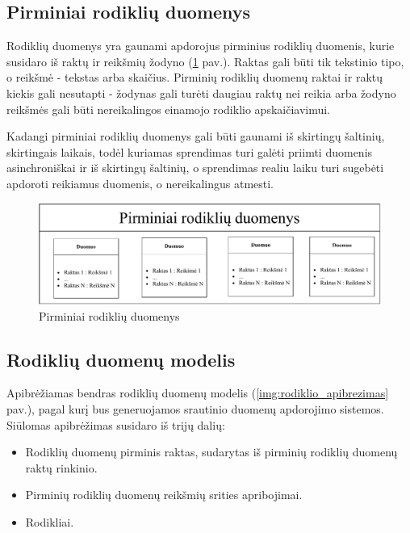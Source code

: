 \documentclass{VUMIFPSbakalaurinis}
\begin{document}
\subsection{Pirminiai rodiklių duomenys}

Rodiklių duomenys yra gaunami apdorojus pirminius rodiklių duomenis, kurie susidaro iš raktų ir reikšmių žodyno (\ref{img:duomenys} pav.). Raktas gali būti tik tekstinio tipo, o reikšmė - tekstas arba skaičius. Pirminių rodiklių duomenų raktai ir raktų kiekis gali nesutapti - žodynas gali turėti daugiau raktų nei reikia arba žodyno reikšmės gali būti nereikalingos einamojo rodiklio apskaičiavimui. \par 
Kadangi pirminiai rodiklių duomenys gali būti gaunami iš skirtingų šaltinių, skirtingais laikais, todėl kuriamas sprendimas turi galėti priimti duomenis asinchroniškai ir iš skirtingų šaltinių, o sprendimas realiu laiku turi sugebėti apdoroti reikiamus duomenis, o nereikalingus atmesti. 

\begin{figure}[H]
    \centering
    \includegraphics[width=1\textwidth]{img/duomenys.pdf}
    \caption{Pirminiai rodiklių duomenys}
    \label{img:duomenys}
\end{figure}

\subsection{Rodiklių duomenų modelis}

Apibrėžiamas bendras rodiklių duomenų modelis (\ref{img:rodiklio_apibrezimas} pav.), pagal kurį bus generuojamos srautinio duomenų apdorojimo sistemos. Siūlomas apibrėžimas susidaro iš trijų dalių: 
\begin{itemize}
    \item Rodiklių duomenų pirminis raktas, sudarytas iš pirminių rodiklių duomenų raktų rinkinio.
    \item Pirminių rodiklių duomenų reikšmių srities apribojimai.
    \item Rodikliai. 
\end{itemize}
\end{document}
